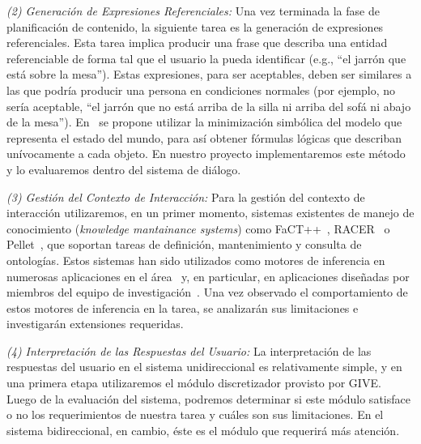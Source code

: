 \emph{(2) Generaci\'on de Expresiones Referenciales:} Una vez terminada la fase de planificaci\'on de contenido, la siguiente tarea
es la generaci\'on de expresiones referenciales. Esta tarea implica producir una
frase que describa una entidad referenciable de forma tal que el usuario
la pueda identificar (e.g., ``el jarr\'on que est\'a sobre la mesa'').
Estas expresiones, para ser aceptables, deben ser similares a las que podr\'ia
producir una persona en condiciones normales (por ejemplo, no ser\'ia aceptable,
``el jarr\'on que no est\'a arriba de la silla ni arriba del
sof\'a ni abajo de la mesa'').  En~\citep{AKS08} se propone utilizar la
minimizaci\'on simb\'olica del modelo que representa
el estado del mundo, para as\'i obtener f\'ormulas l\'ogicas que describan
un\'ivocamente a cada objeto. En nuestro proyecto implementaremos este m\'etodo
y lo evaluaremos dentro del sistema de di\'alogo.

\emph{(3) Gesti\'on del Contexto de Interacci\'on:} Para la gesti\'on del contexto de interacci\'on utilizaremos, en un primer
momento, sistemas existentes de manejo de conocimiento (\emph{knowledge mantainance
systems}) como
FaCT++~\citep{horr:fact99},
RACER~\citep{haar:race99} o Pellet~\citep{siri:pell06}, que soportan tareas de
definici\'on, mantenimiento y consulta de ontolog\'ias.  Estos sistemas
han sido utilizados como motores de inferencia
en numerosas aplicaciones en el \'area~\citep{franconi03,koller04} y,
en particular,  en aplicaciones dise\~nadas por miembros del equipo de
investigaci\'on~\citep{benotti07,benotti09b}.  Una vez observado el
comportamiento de
estos motores de inferencia en la tarea, se analizar\'an sus limitaciones
e investigar\'an extensiones requeridas.

\emph{(4) Interpretaci\'on de las Respuestas del Usuario:} La interpretaci\'on 
de las respuestas del usuario en el sistema unidireccional
es relativamente simple, y en una primera etapa utilizaremos el m\'odulo
discretizador provisto por GIVE.  Luego de la evaluaci\'on del sistema,
podremos determinar si este m\'odulo satisface o no los requerimientos de
nuestra tarea y cu\'ales son sus limitaciones.  En el sistema bidireccional,
en cambio, \'este es el m\'odulo que requerir\'a m\'as atenci\'on.

